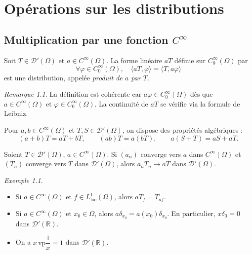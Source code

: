 \documentclass[12pt,a4paper,openany]{book}
\theoremstyle{definition}
\theoremstyle{plain}
\theoremstyle{remark}
\newtheorem*{remark}{Remarque}
\newtheorem*{example}{Exemple}
\newenvironment{remarque}{\begin{remark}}{\end{remark}}
\newenvironment{exemple}{\begin{example}}{\end{example}}
\begin{document}
	\chapter{Opérations sur les distributions}
	
	\section{Multiplication par une fonction \texorpdfstring{$C^\infty$}{C infini}}
	
	\begin{definition}
		Soit $T \in \mathcal{D}'(\Omega)$ et $a \in C^\infty(\Omega)$. La forme linéaire $aT$ définie sur $C_0^\infty(\Omega)$ par
		\[
		\forall \varphi \in C_0^\infty(\Omega), \quad \langle aT, \varphi \rangle = \langle T, a\varphi \rangle
		\]
		est une distribution, appelée \emph{produit de $a$ par $T$}.
	\end{definition}
	
	\begin{remarque}
		La définition est cohérente car $a\varphi \in C_0^\infty(\Omega)$ dès que $a \in C^\infty(\Omega)$ et $\varphi \in C_0^\infty(\Omega)$. La continuité de $aT$ se vérifie via la formule de Leibniz.
	\end{remarque}
	
	Pour $a, b \in C^\infty(\Omega)$ et $T, S \in \mathcal{D}'(\Omega)$, on dispose des propriétés algébriques :
	\[
	(a+b)T = aT + bT, \qquad (ab)T = a(bT), \qquad a(S+T) = aS + aT.
	\]
	
	\begin{proposition}
		Soient $T \in \mathcal{D}'(\Omega)$, $a \in C^\infty(\Omega)$. Si $(a_n)$ converge vers $a$ dans $C^\infty(\Omega)$ et $(T_n)$ converge vers $T$ dans $\mathcal{D}'(\Omega)$, alors $a_n T_n \to aT$ dans $\mathcal{D}'(\Omega)$.
	\end{proposition}
	
	\begin{exemple}
		\begin{itemize}
			\item Si $a \in C^\infty(\Omega)$ et $f \in L^1_{\mathrm{loc}}(\Omega)$, alors $a T_f = T_{af}$.
			\item Si $a \in C^\infty(\Omega)$ et $x_0 \in \Omega$, alors $a\delta_{x_0} = a(x_0)\delta_{x_0}$. En particulier, $x\delta_0 = 0$ dans $\mathcal{D}'(\mathbb{R})$.
			\item On a $x\,\mathrm{vp}\dfrac{1}{x} = 1$ dans $\mathcal{D}'(\mathbb{R})$.
		\end{itemize}
	\end{exemple}
	
\end{document}

